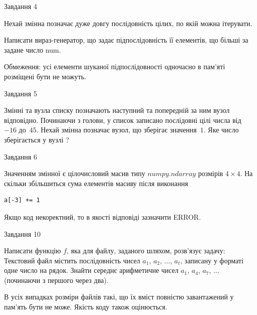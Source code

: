 \documentclass[12pt, ukrainian]{article}
\begin{document}
{               
{\begin{center}Завдання {4}\end{center}}
\vspace{-6mm}
Нехай змінна  позначає дуже довгу послідовність цілих, по якій можна ітерувати.

Написати вираз-генератор, що задає підпослідовність її елементів, що більші за задане число num.

Обмеження: усі елементи шуканої підпослідовності одночасно в пам'яті розміщені бути не можуть.\par

\vspace{10mm}
               
{\begin{center}Завдання {5}\end{center}}
\vspace{-6mm}
Змінні  та  вузла списку позначають наступний та попередній за ним вузол відповідно. Починаючи з голови, у список записано послідовні цілі числа від~$-16$ до~$45$. Нехай змінна  позначає вузол, що зберігає значення~$1$.
Яке число зберігається у вузлі  ?\par

               
{\begin{center}Завдання {6}\end{center}}
\vspace{-6mm}
Значенням змінної  є цілочисловий масив типу $numpy.ndarray$ розмірів $4{\times}4$. На скільки збільшиться сума елементів масиву  після виконання
\begin{verbatim}
a[-3] += 1
\end{verbatim}


Якщо код некоректний, то в якості відповіді зазначити ERROR.\par

               
{\begin{center}Завдання {10}\end{center}}
\vspace{-6mm}

Написати функцію $f$, яка для файлу, заданого шляхом, розв’язує задачу:\\ Текстовий файл містить послідовність чисел $a_1$, $a_2$, $\ldots$, $a_t$, записану у форматі одне число на рядок. Знайти середнє арифметичне чисел $a_1$, $a_4$, $a_7$, $\ldots$ (починаючи з першого через два).

В усіх випадках розміри файлів такі, що їх вміст повністю завантажений у пам'ять бути не може. Якість коду також оцінюється.



}
\end{document}
